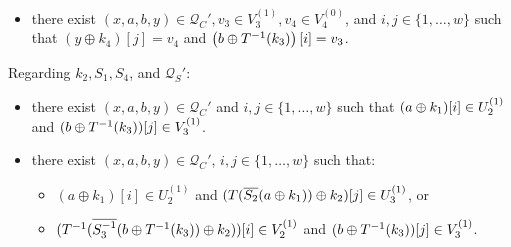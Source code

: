 \begin{definition}
\begin{itemize}[leftmargin=10mm]
	\item[\bfive] there exist $(x,a,b,y) \in \mathcal{Q}_{C}', v_{3}\in V_3^{(1)}, v_{4}\in V_4^{(0)}$, and $i, j \in \{1, \ldots, w\}$ such that $\left(y \oplus k_{4}\right)[j]=v_4$ and $\left(b\oplus T^{-1}(k_3)\right) [i]=v_3$.
%
%
\end{itemize}
%
%
Regarding $k_2,S_1,S_4$, and $\mathcal{Q}_S'$:
%
%
\begin{itemize}[leftmargin=10mm]
	\item[\bsix] there exist $(x,a,b,y) \in \mathcal{Q}_{C}'$ and $i, j \in\{1, \ldots, w\}$ such that $(a\oplus k_1)[i]\in U_2^{(1)}$ and $(b\oplus T^{-1}(k_3))[j]\in V_3^{(1)}$.
	\item[\bseven] there exist $(x,a,b,y) \in \mathcal{Q}_{C}'$, $i, j\in\{1, \ldots, w\}$ such that:
	\begin{itemize}
		\item $(a \oplus k_1)[i]\in U_{2}^{(1)}$ and $(T(\overline{S_2}(a \oplus k_1))\oplus k_2)[j]\in U_{3}^{(1)}$, or
		\item $(T^{-1}(\overline{S_3^{-1}}(b\oplus T^{-1}(k_3))\oplus k_2))[i]\in V_2^{(1)}$ and $(b\oplus T^{-1}(k_3))[j]\in V_{3}^{(1)}$.
	\end{itemize}

\end{itemize}
\end{definition}
